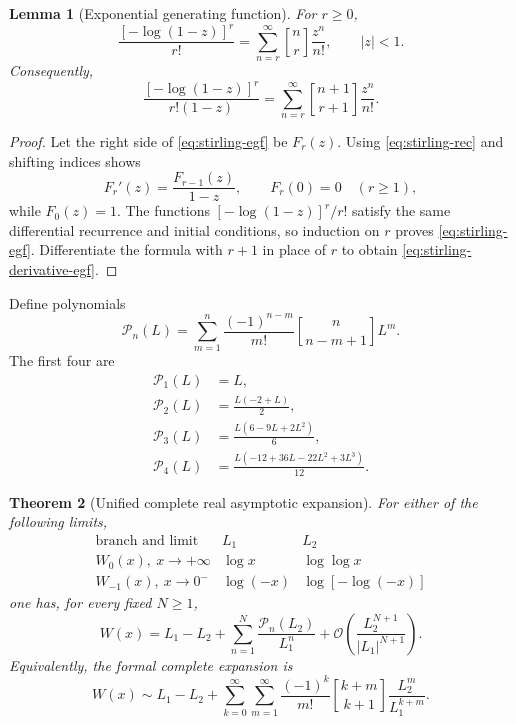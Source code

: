 \documentclass[11pt]{article}
\newtheorem{theorem}{Theorem}[section]
\newtheorem{lemma}[theorem]{Lemma}
\theoremstyle{remark}
\newcommand{\Wz}{W_0}
\newcommand{\Wm}{W_{-1}}
\newcommand{\bigO}{\mathcal O}
\newcommand{\stirling}[2]{\genfrac{[}{]}{0pt}{}{#1}{#2}}
\newcommand{\abs}[1]{\left|#1\right|}
\begin{document}
\begin{lemma}[Exponential generating function]\label{lem:stirling-egf}
For \(r\geq0\),
\begin{equation}\label{eq:stirling-egf}
 \frac{[-\log(1-z)]^r}{r!}
 =\sum_{n=r}^{\infty}\stirling{n}{r}\frac{z^n}{n!},
 \qquad |z|<1.
\end{equation}
Consequently,
\begin{equation}\label{eq:stirling-derivative-egf}
 \frac{[-\log(1-z)]^r}{r!(1-z)}
 =\sum_{n=r}^{\infty}
   \stirling{n+1}{r+1}\frac{z^n}{n!}.
\end{equation}
\end{lemma}

\begin{proof}
Let the right side of \eqref{eq:stirling-egf} be \(F_r(z)\).
Using \eqref{eq:stirling-rec} and shifting indices shows
\[
       F_r'(z)=\frac{F_{r-1}(z)}{1-z},\qquad F_r(0)=0
       \quad(r\geq1),
\]
while \(F_0(z)=1\).  The functions
\([-\log(1-z)]^r/r!\) satisfy the same differential recurrence and initial
conditions, so induction on \(r\) proves \eqref{eq:stirling-egf}.
Differentiate the formula with \(r+1\) in place of \(r\) to obtain
\eqref{eq:stirling-derivative-egf}.
\end{proof}

Define polynomials
\begin{equation}\label{eq:Pn-asym}
 \mathcal P_n(L)
 =\sum_{m=1}^n
   \frac{(-1)^{n-m}}{m!}
   \stirling{n}{n-m+1}L^m.
\end{equation}
The first four are
\begin{align}
 \mathcal P_1(L)&=L,\label{eq:P1}\\
 \mathcal P_2(L)&=\frac{L(-2+L)}2,\label{eq:P2}\\
 \mathcal P_3(L)&=\frac{L(6-9L+2L^2)}6,\label{eq:P3}\\
 \mathcal P_4(L)&=\frac{L(-12+36L-22L^2+3L^3)}{12}.
 \label{eq:P4}
\end{align}

\begin{theorem}[Unified complete real asymptotic expansion]\label{thm:fullasym}
For either of the following limits,
\[
 \begin{array}{c|c|c}
 \text{branch and limit}&L_1&L_2\\ \hline
 \Wz(x),\ x\to+\infty&\log x&\log\log x\\
 \Wm(x),\ x\to0^-&\log(-x)&\log[-\log(-x)]
 \end{array}
\]
one has, for every fixed \(N\geq1\),
\begin{equation}\label{eq:fullasym}
 W(x)=L_1-L_2+
 \sum_{n=1}^{N}\frac{\mathcal P_n(L_2)}{L_1^n}
 +\bigO\left(
 \frac{L_2^{N+1}}{\abs{L_1}^{N+1}}
 \right).
\end{equation}
Equivalently, the formal complete expansion is
\begin{equation}\label{eq:doubleasym}
 W(x)\sim L_1-L_2+
 \sum_{k=0}^{\infty}\sum_{m=1}^{\infty}
 \frac{(-1)^k}{m!}
 \stirling{k+m}{k+1}
 \frac{L_2^m}{L_1^{k+m}}.
\end{equation}
\end{theorem}
\end{document}
